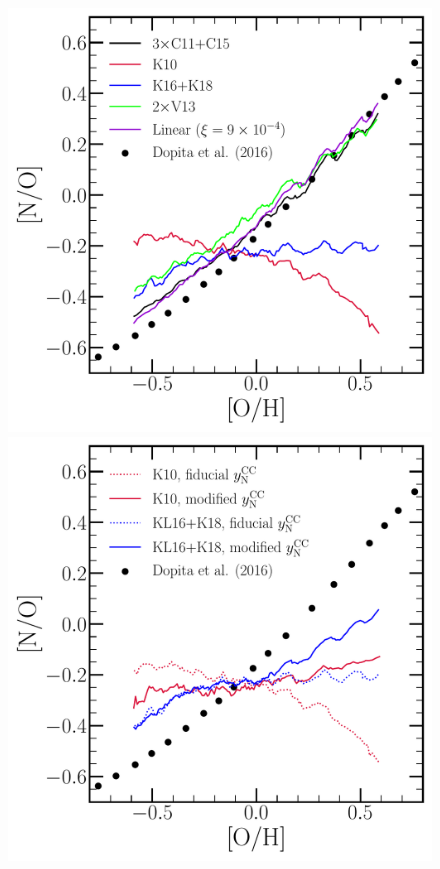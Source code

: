 \documentclass[ms.tex]{subfiles}
\begin{document}
\begin{figure} 
\centering 
\includegraphics[scale = 0.45]{no_oh_predictions.pdf} 
\includegraphics[scale = 0.45]{no_oh_predictions_karakas.pdf} 

\end{figure}
\end{document}
